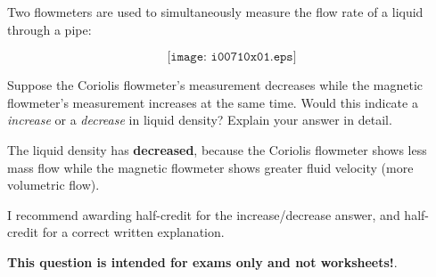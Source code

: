 

Two flowmeters are used to simultaneously measure the flow rate of a liquid through a pipe:

$$\texttt{[image: i00710x01.eps]}$$

Suppose the Coriolis flowmeter's measurement decreases while the magnetic flowmeter's measurement increases at the same time.  Would this indicate a {\it increase} or a {\it decrease} in liquid density?  Explain your answer in detail.

\vskip 50pt







The liquid density has {\bf decreased}, because the Coriolis flowmeter shows less mass flow while the magnetic flowmeter shows greater fluid velocity (more volumetric flow).

\vskip 10pt

I recommend awarding half-credit for the increase/decrease answer, and half-credit for a correct written explanation.







{\bf This question is intended for exams only and not worksheets!}.



